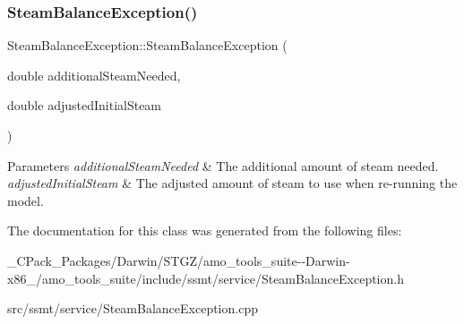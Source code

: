 \subsubsection{\texorpdfstring{Steam\+Balance\+Exception()}{SteamBalanceException()}\hspace{0.1cm}{\footnotesize\ttfamily [3/3]}}
{\footnotesize\ttfamily Steam\+Balance\+Exception\+::\+Steam\+Balance\+Exception (\begin{DoxyParamCaption}\item[{double}]{additional\+Steam\+Needed,  }\item[{double}]{adjusted\+Initial\+Steam }\end{DoxyParamCaption})}


\begin{DoxyParams}{Parameters}
{\em additional\+Steam\+Needed} & The additional amount of steam needed. \\
\hline
{\em adjusted\+Initial\+Steam} & The adjusted amount of steam to use when re-\/running the model. \\
\hline
\end{DoxyParams}


The documentation for this class was generated from the following files\+:\begin{DoxyCompactItemize}
\item 
\+\_\+\+C\+Pack\+\_\+\+Packages/\+Darwin/\+S\+T\+G\+Z/amo\+\_\+tools\+\_\+suite-\/-\/\+Darwin-\/x86\+\_/amo\+\_\+tools\+\_\+suite/include/ssmt/service/Steam\+Balance\+Exception.\+h\item 
src/ssmt/service/Steam\+Balance\+Exception.\+cpp\end{DoxyCompactItemize}
